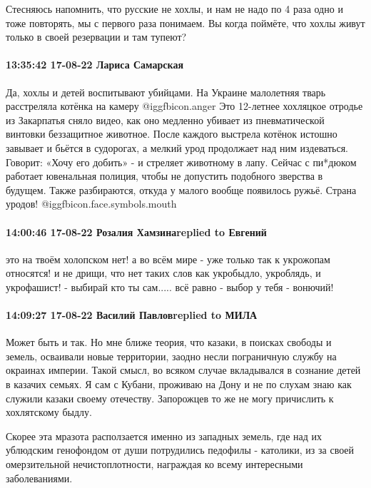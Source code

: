 Стесняюсь напомнить, что русские не хохлы, и нам не надо по 4 раза одно и тоже
повторять, мы с первого раза понимаем.
Вы когда поймёте, что хохлы живут только в своей резервации и там тупеют?

\paragraph{13:35:42 17-08-22 Лариса Самарская}

\obeycr
Да, хохлы и детей воспитывают убийцами.
На Украине малолетняя тварь расстреляла котёнка на камеру @igg{fbicon.anger} 
Это 12-летнее хохляцкое отродье из Закарпатья сняло видео, как оно медленно убивает из пневматической винтовки беззащитное животное.
После каждого выстрела котёнок истошно завывает и бьётся в судорогах, а мелкий урод продолжает над ним издеваться. Говорит: «Хочу его добить» - и стреляет животному в лапу.
Сейчас с пи*дюком работает ювенальная полиция, чтобы не допустить подобного зверства в будущем. Также разбираются, откуда у малого вообще появилось ружьё.
Страна уродов! @igg{fbicon.face.symbols.mouth} 
\restorecr

\paragraph{14:00:46 17-08-22 Розалия Хамзинаreplied to Евгений}

это на твоём холопском нет! а во всём мире - уже только так к укрожопам
относятся! и не дрищи, что нет таких слов как укробыдло, укроблядь, и
укрофашист! - выбирай кто ты сам..... всё равно - выбор у тебя - вонючий!

\paragraph{14:09:27 17-08-22 Василий Павловreplied to МИЛА}

Может быть и так. Но мне ближе теория, что казаки, в поисках свободы и земель,
осваивали новые территории, заодно несли пограничную службу на окраинах
империи. Такой смысл, во всяком случае вкладывался в сознание детей в казачих
семьях. Я сам с Кубани, проживаю на Дону и не по слухам знаю как служили казаки
своему отечеству. Запорожцев то же не могу причислить к хохлятскому быдлу.

Скорее эта мразота расползается именно из западных земель, где над их ублюдским
генофондом от души потрудились педофилы - католики, из за своей омерзительной
нечистоплотности, награждая ко всему интересными заболеваниями.

